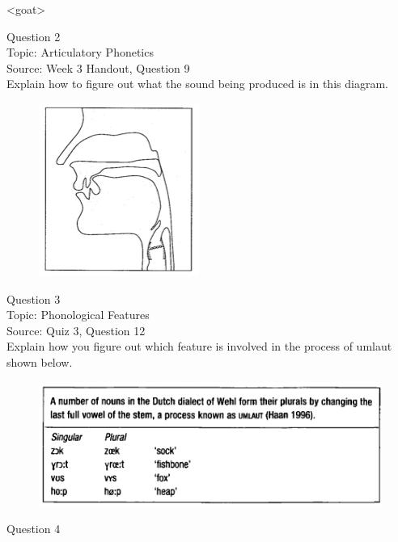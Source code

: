 \documentclass[12pt]{article}
\begin{document}
<goat>


\newpage

{\large Question 2}\\

Topic: Articulatory Phonetics\\
Source: Week 3 Handout, Question 9\\

Explain how to figure out what the sound being produced is in this diagram.\\

\begin{figure}[H]
\includegraphics{../images/sagittal_z.png}
\end{figure}

\newpage

{\large Question 3}\\

Topic: Phonological Features\\
Source: Quiz 3, Question 12\\

Explain how you figure out which feature is involved in the process of umlaut shown below.\\

\begin{figure}[H]
\includegraphics{../images/dutch.png}
\end{figure}

\newpage

{\large Question 4}\\
\end{document}
